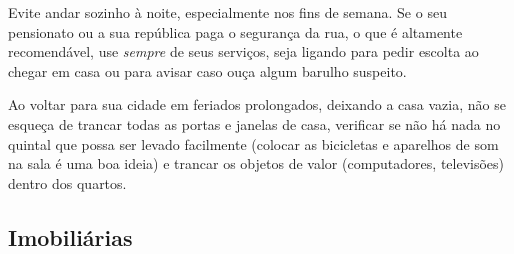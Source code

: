 Evite andar sozinho à noite, especialmente nos fins de semana. Se o seu
pensionato ou a sua república paga o segurança da rua, o que é altamente
recomendável, use \emph{sempre} de seus serviços, seja ligando para pedir
escolta ao chegar em casa ou para avisar caso ouça algum barulho suspeito.

Ao voltar para sua cidade em feriados prolongados, deixando a casa vazia, não se
esqueça de trancar todas as portas e janelas de casa, verificar se não há nada
no quintal que possa ser levado facilmente (colocar as bicicletas e aparelhos de
som na sala é uma boa ideia) e trancar os objetos de valor (computadores,
televisões) dentro dos quartos.

\subsection{Imobiliárias}

